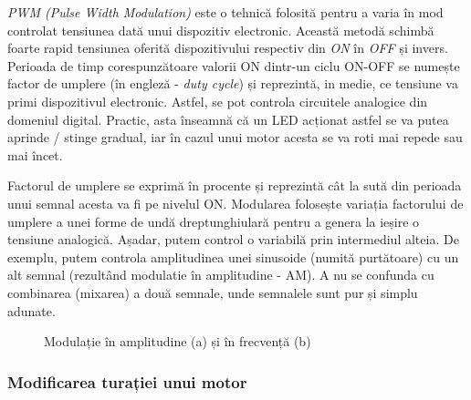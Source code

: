 \textit{PWM (Pulse Width Modulation)} este o tehnică folosită pentru a varia în mod controlat tensiunea dată unui dispozitiv electronic. Această metodă schimbă foarte rapid tensiunea oferită dispozitivului respectiv din \textit{ON} în \textit{OFF} și invers. Perioada de timp corespunzătoare valorii ON dintr-un ciclu ON-OFF se numește factor de umplere (în engleză - \textit{duty cycle}) și reprezintă, in medie, ce tensiune va primi dispozitivul electronic. Astfel, se pot controla circuitele analogice din domeniul digital. Practic, asta înseamnă că un LED acționat astfel se va putea aprinde / stinge gradual, iar în cazul unui motor acesta se va roti mai repede sau mai încet.

Factorul de umplere se exprimă în procente și reprezintă cât la sută din perioada unui semnal acesta va fi pe nivelul ON. Modularea folosește variația factorului de umplere a unei forme de undă dreptunghiulară pentru a genera la ieșire o tensiune analogică. Așadar, putem control o variabilă prin intermediul alteia. De exemplu, putem controla amplitudinea unei sinusoide (numită purtătoare) cu un alt semnal (rezultând modulatie în amplitudine - AM). A nu se confunda cu combinarea (mixarea) a două semnale, unde semnalele sunt pur și simplu adunate.

\begin{figure}
    \centering
    \caption{Modulație în amplitudine (a) și în frecvență (b)} 
    \label{fig:CodeWarrior-Modulation} 
\end{figure} 

\subsubsection{Modificarea turației unui motor}

